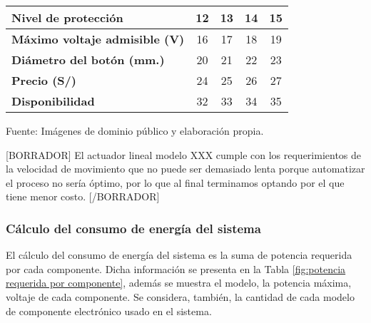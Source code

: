 \begin{mytable}[H]
\begin{tabular}{l|c|c|c|c|}
	\multicolumn{1}{|l|}{\textbf{Nivel de protección}}      & 12                                                                    & 13         & 14         & 15         \\ \hline
	\multicolumn{1}{|l|}{
		\begin{minipage}{\myforthmaxsizeofcontenttable}			
			\textbf{Máximo voltaje admisible (V)}
		\end{minipage}
	} &
	16
	& 17         & 18         & 19         \\ \hline
	\multicolumn{1}{|l|}{
			\begin{minipage}{\myforthmaxsizeofcontenttable}			
				\textbf{Diámetro del botón (mm.)}
			\end{minipage}
	} & 20                                                                    & 21         & 22         & 23         \\ \hline
	\multicolumn{1}{|l|}{\textbf{Precio (S/)}}              & 24                                                                    & 25         & 26         & 27         \\ \hline
	\multicolumn{1}{|l|}{\textbf{Disponibilidad}}           & 32                                                                    & 33         & 34         & 35         \\ \hline
	\end{tabular}
	\begin{flushleft}	
		Fuente: Imágenes de dominio público y elaboración propia.
	\end{flushleft}
\end{mytable}

[BORRADOR] El actuador lineal modelo XXX cumple con los requerimientos de la velocidad de movimiento que no puede ser demasiado lenta porque automatizar el proceso no sería óptimo, por lo que al final terminamos optando por el que tiene menor costo. [/BORRADOR]

\subsubsection{Cálculo del consumo de energía del sistema} 

El cálculo del consumo de energía del sistema es la suma de potencia requerida por cada componente. Dicha información se presenta en la Tabla \ref{fig:potencia requerida por componente}, además se muestra el modelo, la potencia máxima, voltaje de cada componente. Se considera, también, la cantidad de cada modelo de componente electrónico usado en el sistema.


